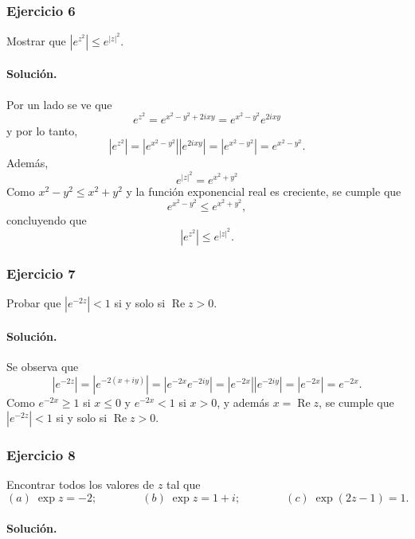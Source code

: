 \documentclass[a4paper]{report}
\renewcommand{\Re}{\operatorname{Re}}
\begin{document}
\subsubsection{Ejercicio 6}

Mostrar que \(|e^{z^2}|\leq e^{|z|^2}\).

\paragraph{Solución.} Por un lado se ve que 
\[
 e^{z^2}=e^{x^2-y^2+2ixy}=e^{x^2-y^2}e^{2ixy}
\]
y por lo tanto,
\[
 |e^{z^2}|=|e^{x^2-y^2}||e^{2ixy}|=|e^{x^2-y^2}|=e^{x^2-y^2}.
\]
Además,
\[
 e^{|z|^2}=e^{x^2+y^2}
\]
Como \(x^2-y^2\leq x^2+y^2\) y la función exponencial real es creciente, se cumple que 
\[
 e^{x^2-y^2}\leq e^{x^2+y^2},
\]
concluyendo que 
\[
 |e^{z^2}|\leq e^{|z|^2}.
\]

\subsubsection{Ejercicio 7}

Probar que \(|e^{-2z}|<1\) si y solo si \(\Re z>0\).

\paragraph{Solución.} Se observa que
\[
 |e^{-2z}|=|e^{-2(x+iy)}|=|e^{-2x}e^{-2iy}|=|e^{-2x}||e^{-2iy}|=|e^{-2x}|=e^{-2x}.
\]
Como \(e^{-2x}\geq1\) si \(x\leq0\) y \(e^{-2x}<1\) si \(x>0\), y además \(x=\Re z\), se cumple que \(|e^{-2z}|<1\) si y solo si \(\Re z>0\). 

\subsubsection{Ejercicio 8}

Encontrar todos los valores de \(z\) tal que 
\[
 (\textit{a})\;\exp z=-2;\qquad\qquad 
 (\textit{b})\;\exp z=1+i;\qquad\qquad
 (\textit{c})\;\exp(2z-1)=1.
\]

\paragraph{Solución.} 
\end{document}
